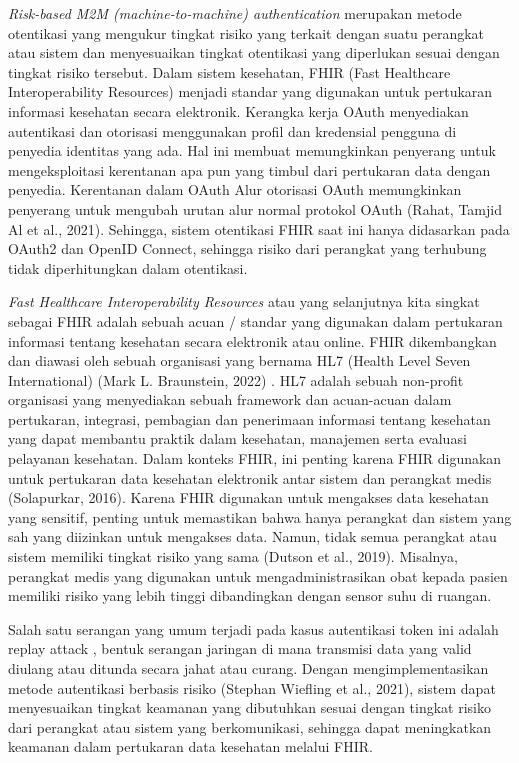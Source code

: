 \textit{Risk-based M2M (machine-to-machine) authentication} merupakan metode otentikasi yang mengukur tingkat risiko yang terkait dengan suatu perangkat atau sistem dan menyesuaikan tingkat otentikasi yang diperlukan sesuai dengan tingkat risiko tersebut. Dalam sistem kesehatan, FHIR (Fast Healthcare Interoperability Resources) menjadi standar yang digunakan untuk pertukaran informasi kesehatan secara elektronik. Kerangka kerja OAuth menyediakan autentikasi dan otorisasi menggunakan profil dan kredensial pengguna di penyedia identitas yang ada. Hal ini membuat memungkinkan penyerang untuk mengeksploitasi kerentanan apa pun yang timbul dari pertukaran data dengan penyedia. Kerentanan dalam OAuth Alur otorisasi OAuth memungkinkan penyerang untuk mengubah urutan alur normal protokol OAuth (Rahat, Tamjid Al et al., 2021). Sehingga, sistem otentikasi FHIR saat ini hanya didasarkan pada OAuth2 dan OpenID Connect, sehingga risiko dari perangkat yang terhubung tidak diperhitungkan dalam otentikasi.

\textit{Fast Healthcare Interoperability Resources} atau yang selanjutnya kita singkat sebagai FHIR adalah sebuah acuan / standar yang digunakan dalam pertukaran informasi tentang kesehatan secara elektronik atau online. FHIR dikembangkan dan diawasi oleh sebuah organisasi yang bernama HL7 (Health Level Seven International) (Mark L. Braunstein, 2022) . HL7 adalah sebuah non-profit organisasi yang menyediakan sebuah framework dan acuan-acuan dalam pertukaran, integrasi, pembagian dan penerimaan informasi tentang kesehatan yang dapat membantu praktik dalam kesehatan, manajemen serta evaluasi pelayanan kesehatan. Dalam konteks FHIR, ini penting karena FHIR digunakan untuk pertukaran data kesehatan elektronik antar sistem dan perangkat medis (Solapurkar, 2016). Karena FHIR digunakan untuk mengakses data kesehatan yang sensitif, penting untuk memastikan bahwa hanya perangkat dan sistem yang sah yang diizinkan untuk mengakses data. Namun, tidak semua perangkat atau sistem memiliki tingkat risiko yang sama (Dutson et al., 2019). Misalnya, perangkat medis yang digunakan untuk mengadministrasikan obat kepada pasien memiliki risiko yang lebih tinggi dibandingkan dengan sensor suhu di ruangan.

Salah satu serangan yang umum terjadi pada kasus autentikasi token ini adalah replay attack , bentuk serangan jaringan di mana transmisi data yang valid diulang atau ditunda secara jahat atau curang. Dengan mengimplementasikan metode autentikasi berbasis risiko (Stephan Wiefling et al., 2021), sistem dapat menyesuaikan tingkat keamanan yang dibutuhkan sesuai dengan tingkat risiko dari perangkat atau sistem yang berkomunikasi, sehingga dapat meningkatkan keamanan dalam pertukaran data kesehatan melalui FHIR.